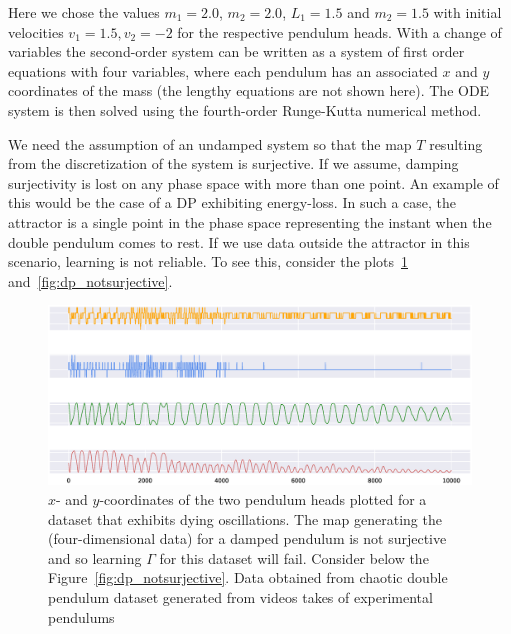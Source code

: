 Here we chose the values $m_1=2.0$, $m_2=2.0$, $L_1=1.5$ and $m_2=1.5$ with initial velocities $v_1=1.5, v_2=-2$ for the respective pendulum heads.
With a change of variables the second-order system can be written as a system of first order equations with four variables, where each pendulum has an associated $x$ and $y$ coordinates of the mass (the lengthy equations are not shown here). 
The ODE system is then solved using the fourth-order Runge-Kutta numerical method.  


We need the assumption of an undamped system so that the map $T$ resulting from the discretization of the system  is surjective.  If we assume, damping surjectivity is lost on any phase space with more than one point.  
An example of this would be the case of a DP exhibiting energy-loss. In such a case, the attractor is a single point in the phase space representing the instant when the double pendulum comes to rest. 
If we use data outside the attractor in this scenario, learning is not reliable. To see this, consider the plots~\ref{fig:damped_pendulum} and~\ref{fig:dp_notsurjective}.

\begin{figure}[ht]
  \includegraphics[scale=0.4]{Graphs/_dp_dying.eps}
  \centering
\caption{$x$- and $y$-coordinates of the two pendulum heads plotted for a dataset that exhibits dying oscillations. The map generating the (four-dimensional data) for a damped pendulum is not surjective and so learning $\Gamma$ for this dataset will fail. Consider below the Figure~\ref{fig:dp_notsurjective}. Data obtained from chaotic double pendulum dataset generated from videos takes of experimental pendulums~\cite{asseman2018learning}}
\label{fig:damped_pendulum}
\end{figure}

